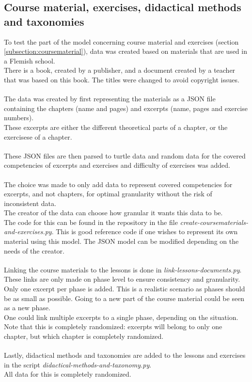 \documentclass[a4paper]{report}
\begin{document}
    \subsection{Course material, exercises, didactical methods and taxonomies}
    To test the part of the model concerning course material and exercises (section \ref{subsection:coursematerial}), data was created based on materials that are used in a Flemish school.\\
    There is a book, created by a publisher, and a document created by a teacher that was based on this book.
    The titles were changed to avoid copyright issues.\\ \\
    The data was created by first representing the materials as a JSON file containing the chapters (name and pages) and excerpts (name, pages and exercise numbers).\\
    These excerpts are either the different theoretical parts of a chapter, or the exercisese of a chapter.\\ \\
    These JSON files are then parsed to turtle data and random data for the covered competencies of excerpts and exercises and difficulty of exercises was added.\\ \\
    The choice was made to only add data to represent covered competencies for excerpts, and not chapters, for optimal granularity without the risk of inconsistent data.\\
    The creator of the data can choose how granular it wants this data to be.\\
    The code for this can be found in the repository \cite{repo} in the file \textit{create-coursematerials-and-exercises.py}.
    This is good reference code if one wishes to represent its own material using this model. The JSON model can be modified depending on the needs of the creator.\\ \\
    Linking the course materials to the lessons is done in \textit{link-lessons-documents.py}.\\
    These links are only made on phase level to ensure consistency and granularity.
    Only one excerpt per phase is added. This is a realistic scenario as phases should be as small as possible. Going to a new part of the course material could be seen as a new phase.\\
    One could link multiple excerpts to a single phase, depending on the situation.\\
    Note that this is completely randomized: excerpts will belong to only one chapter, but which chapter is completely randomized.\\ \\
    Lastly, didactical methods and taxonomies are added to the lessons and exercises in the script \textit{didactical-methods-and-taxonomy.py}.\\
    All data for this is completely randomized.\\
\end{document}
